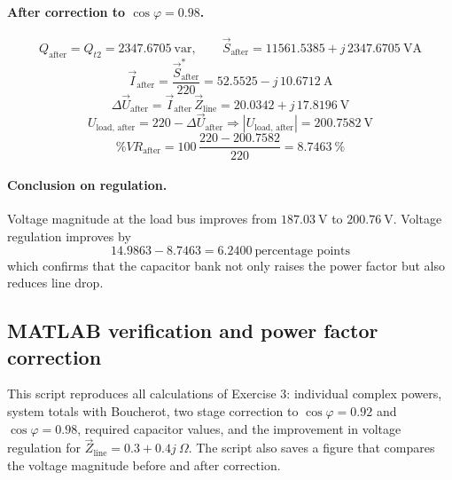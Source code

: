 \documentclass[a4paper,12pt]{article}
\begin{document}
\paragraph{After correction to \(\cos\varphi=0.98\).}
\[
Q_{\text{after}} = Q_{t2} = 2347.6705\ \text{var},\qquad
\vec S_{\text{after}} = 11561.5385 + j\,2347.6705\ \text{VA}
\]
\[
\vec I_{\text{after}} = \frac{\vec S_{\text{after}}^{\ast}}{220}
= 52.5525 - j\,10.6712\ \text{A}
\]
\[
\Delta \vec U_{\text{after}} = \vec I_{\text{after}}\,\vec Z_{\text{line}}
= 20.0342 + j\,17.8196\ \text{V}
\]
\[
U_{\text{load, after}} = 220 - \Delta \vec U_{\text{after}}
\Rightarrow |U_{\text{load, after}}| = \boxed{200.7582\ \text{V}}
\]
\[
\%VR_{\text{after}} = 100\,\frac{220 - 200.7582}{220}
= \boxed{8.7463\ \%}
\]

\paragraph{Conclusion on regulation.}
Voltage magnitude at the load bus improves from \(187.03\ \text{V}\) to \(200.76\ \text{V}\).  
Voltage regulation improves by
\[
\boxed{14.9863 - 8.7463 = 6.2400\ \text{percentage points}}
\]
which confirms that the capacitor bank not only raises the power factor but also reduces line drop.


\subsection{MATLAB verification and power factor correction}

This script reproduces all calculations of Exercise 3: individual complex powers, system totals with Boucherot, two stage correction to \(\cos\varphi=0.92\) and \(\cos\varphi=0.98\), required capacitor values, and the improvement in voltage regulation for \(\vec Z_{\text{line}}=0.3+0.4j~\Omega\).  
The script also saves a figure that compares the voltage magnitude before and after correction.
\end{document}
